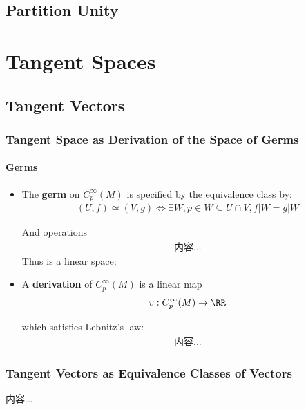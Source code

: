 \documentclass[Total.tex]{subfiles}
\begin{document}
		\section{Partition Unity}
	\chapter{Tangent Spaces}
		\section{Tangent Vectors}	
			\subsection{Tangent Space as Derivation of the Space of Germs}
				\subsubsection{Germs}
				\begin{Def}
					\begin{itemize}
						\item 
						The \textbf{germ} on $C_p^\infty(M)$ is specified by the equivalence class by:
						\begin{gather*}
							(U,f)\simeq (V,g)\Leftrightarrow \exists W,p\in W\subseteq U\cap V, f|W=g|W
						\end{gather*}
						
						And operations
						\begin{gather*}
							内容...
						\end{gather*}
						Thus is a linear space;
						\item A \textbf{derivation} of $C_p^\infty(M)$ is a linear map
						\begin{gather*}
							v:C^\infty_p(M)\rightarrow \RR
						\end{gather*}
						
						which satisfies Lebnitz's law:
						\begin{gather*}
							内容...
						\end{gather*}
					\end{itemize}
				\end{Def}
				
			\subsection{Tangent Vectors as Equivalence Classes of Vectors}
				\begin{Def}
					内容...
				\end{Def}
\end{document}
